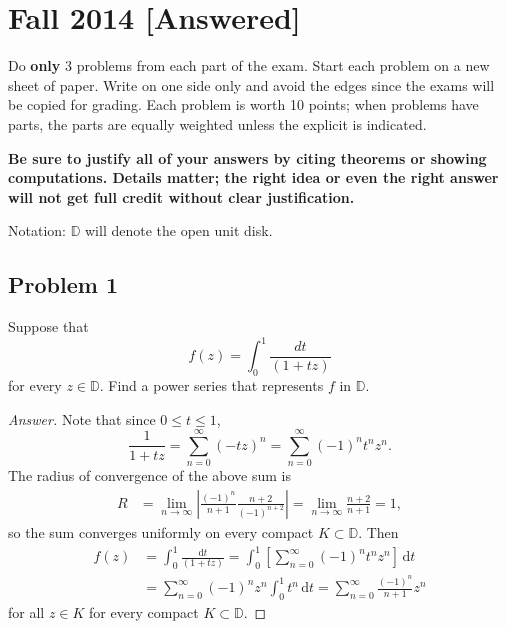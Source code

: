 \documentclass[12pt]{article}
\newcommand\paren[1]{\left( #1 \right)}
\newcommand{\sqbrack}[1]{\left [ #1 \right ]}
\newcommand{\abs}[1]{\left| #1 \right|}
\theoremstyle{definition}
\begin{document}
\section{Fall 2014 [Answered]}
Do \textbf{only} 3 problems from each part of the exam. Start each problem on a new sheet of paper. Write on one side only and avoid the edges since the exams will be copied for grading. Each problem is worth 10 points; when problems have parts, the parts are equally weighted unless the explicit is indicated.

\textbf{Be sure to justify all of your answers by citing theorems or showing computations. Details matter; the right idea or even the right answer will not get full credit without clear justification.}

Notation: $\mathbb{D}$ will denote the open unit disk.
\subsection{Problem 1}
Suppose that 
\[
    f(z) = \int_0^1 \frac{dt}{(1+tz)}
\]
for every $z \in \mathbb{D}$. Find a power series that represents $f$ in $\mathbb{D}$.
\begin{proof}[Answer]
    Note that since $0 \leq t \leq 1$,
    \[
        \frac{1}{1+tz} = \sum\limits_{n = 0}^{\infty} \paren{-tz}^n = \sum\limits_{n = 0}^{\infty} (-1)^n t^n z^n.
    \]
    The radius of convergence of the above sum is 
    \begin{align*}
        R & = \lim\limits_{n \to \infty} \abs{ \frac{(-1)^n}{n+1} \frac{n+2}{(-1)^{n+2}} } = \lim\limits_{n \to \infty} \frac{n+2}{n+1} = 1,
    \end{align*}
    so the sum converges uniformly on every compact $K \subset \mathbb{D}$. Then 
    \begin{align*}
        f(z) & = \int_0^1 \frac{\mathrm{d}t}{(1+tz)} = \int_0^1 \sqbrack{ \sum\limits_{n = 0}^{\infty} (-1)^n t^n z^n } \, \mathrm{d}t \\
        & = \sum\limits_{n = 0}^{\infty} (-1)^n z^n \int_0^1 t^n \, \mathrm{d}t = \sum\limits_{n = 0}^{\infty} \frac{(-1)^n}{n+1} z^n
    \end{align*}
    for all $z \in K$ for every compact $K \subset \mathbb{D}$.
\end{proof}
\end{document}
